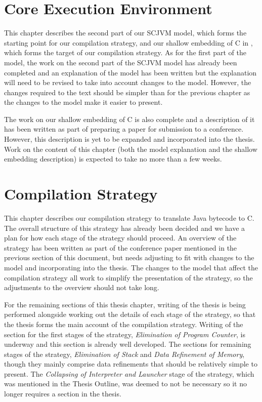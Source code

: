 \documentclass[a4paper,12pt]{article}
\begin{document}
\section{Core Execution Environment}

This chapter describes the second part of our SCJVM model, which forms
the starting point for our compilation strategy, and our shallow
embedding of C in \Circus{}, which forms the target of our compilation
strategy.
As for the first part of the model, the work on the second part of the
SCJVM model has already been completed and an explanation of the model
has been written but the explanation will need to be revised to take
into account changes to the model.
However, the changes required to the text should be simpler than for
the previous chapter as the changes to the model make it easier to
present.

The work on our shallow embedding of C is also complete and a
description of it has been written as part of preparing a paper for
submission to a conference.
However, this description is yet to be expanded and incorporated into
the thesis. 
Work on the content of this chapter (both the model explanation and
the shallow embedding description) is expected to take no more than a
few weeks.

\section{Compilation Strategy}

This chapter describes our compilation strategy to translate Java
bytecode to C.
The overall structure of this strategy has already been decided and we
have a plan for how each stage of the strategy should proceed.
An overview of the strategy has been written as part of the conference
paper mentioned in the previous section of this document, but needs adjusting to fit
with changes to the model and incorporating into the thesis.
The changes to the model that affect the compilation strategy all work
to simplify the presentation of the strategy, so the adjustments to
the overview should not take long.

For the remaining sections of this thesis chapter, writing of the
thesis is being performed alongside working out the details of each
stage of the strategy, so that the thesis forms the main account of
the compilation strategy.
Writing of the section for the first stages of the strategy,
\emph{Elimination of Program Counter}, is underway and this section is
already well developed.
The sections for remaining stages of the strategy, \emph{Elimination
  of Stack} and \emph{Data Refinement of Memory}, though they mainly
comprise data refinements that should be relatively simple to present.
The \emph{Collapsing of Interpreter and Launcher} stage of the
strategy, which was mentioned in the Thesis Outline, was deemed to not
be necessary so it no longer requires a section in the thesis.
\end{document}
